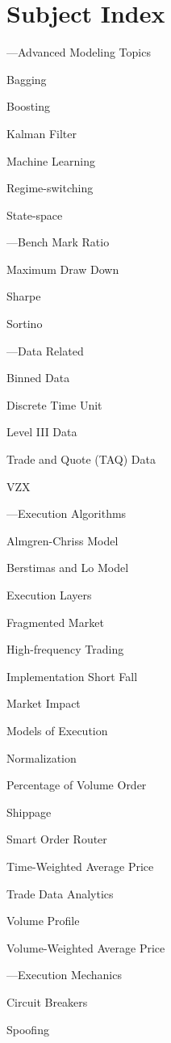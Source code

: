 \chapter*{Subject Index}
\nopagebreak
\begin{minipage}{0.40\textwidth}
\noindent ---Advanced Modeling Topics
	\begin{flushright}
	Bagging \par
	Boosting \par
	Kalman Filter \par
	Machine Learning \par
	Regime-switching \par
	State-space 
	\end{flushright}


\noindent ---Bench Mark Ratio
	\begin{flushright}
	Maximum Draw Down \par
	Sharpe \par
	Sortino
	\end{flushright}


\noindent ---Data Related
	\begin{flushright}
	Binned Data \par
	Discrete Time Unit \par
	Level III Data \par
	Trade and Quote (TAQ) Data \par 
	VZX
	\end{flushright}


\noindent ---Execution Algorithms
	\begin{flushright}
	Almgren-Chriss Model \par
	Berstimas and Lo Model \par
	Execution Layers \par
	Fragmented Market \par
	High-frequency Trading \par
	Implementation Short Fall \par
	Market Impact \par
	Models of Execution \par
	Normalization \par
	Percentage of Volume Order \par
	Shippage \par
	Smart Order Router \par
	Time-Weighted Average Price \par
	Trade Data Analytics \par
	Volume Profile \par
	Volume-Weighted Average Price 
	\end{flushright}


\noindent ---Execution Mechanics
	\begin{flushright}
	Circuit Breakers \par
	Spoofing
	\end{flushright}
\end{minipage} \hfill
